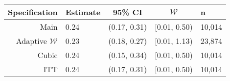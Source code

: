 \begin{tabular}{rlccl}
  \hline
Specification & Estimate & 95\% CI & $\mathcal{W}$ & n \\ 
  \hline
Main & 0.24 & (0.17, 0.31) & [0.01, 0.50) & 10,014 \\ 
  Adaptive $\mathcal{W}$ & 0.23 & (0.18, 0.27) & [0.01, 1.13) & 23,874 \\ 
  Cubic & 0.24 & (0.15, 0.34) & [0.01, 0.50) & 10,014 \\ 
  ITT & 0.24 & (0.17, 0.31) & [0.01, 0.50) & 10,014 \\ 
   \hline
\end{tabular}
